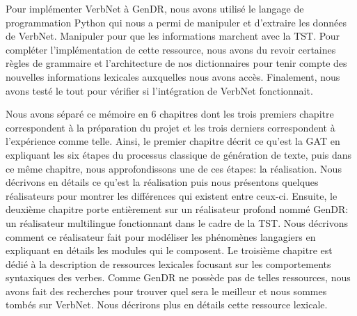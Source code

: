 
Pour implémenter VerbNet à GenDR, nous avons utilisé le langage de programmation Python qui nous a permi de manipuler et d'extraire les données de VerbNet. Manipuler pour que les informations marchent avec la TST. Pour compléter l'implémentation de cette ressource, nous avons du revoir certaines règles de grammaire et l'architecture de nos dictionnaires pour tenir compte des nouvelles informations lexicales auxquelles nous avons accès. Finalement, nous avons testé le tout pour vérifier si l'intégration de VerbNet fonctionnait.

Nous avons séparé ce mémoire en 6 chapitres dont les trois premiers chapitre correspondent à la préparation du projet et les trois derniers correspondent à l'expérience comme telle. Ainsi, le premier chapitre décrit ce qu'est la \ac{GAT} en expliquant les six étapes du processus classique de génération de texte, puis dans ce même chapitre, nous approfondissons une de ces étapes: la réalisation. Nous décrivons en détails ce qu'est la réalisation puis nous présentons quelques réalisateurs pour montrer les différences qui existent entre ceux-ci. Ensuite, le deuxième chapitre porte entièrement sur un réalisateur profond nommé GenDR: un réalisateur multilingue fonctionnant dans le cadre de la \ac{TST}. Nous décrivons comment ce réalisateur fait pour modéliser les phénomènes langagiers en expliquant en détails les modules qui le composent. Le troisième chapitre est dédié à la description de ressources lexicales focusant sur les comportements syntaxiques des verbes. Comme GenDR ne possède pas de telles ressources, nous avons fait des recherches pour trouver quel sera le meilleur et nous sommes tombés sur VerbNet. Nous décrirons plus en détails cette ressource lexicale.

